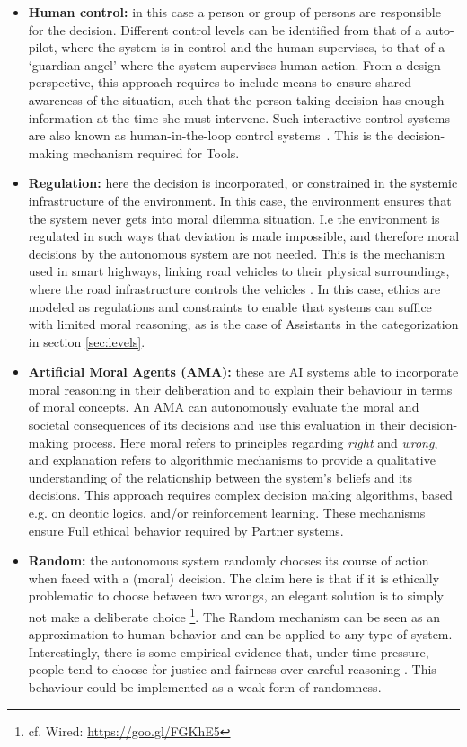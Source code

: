 \documentclass[twocolumn]{article}
\begin{document}
\begin{itemize}
\item \textbf{Human control:} in this case a person or group of persons are responsible for the decision. Different control levels can be identified from that of a auto-pilot, where the system is in control and the human supervises, to that of a `guardian angel' where the system supervises human action. %
From a design perspective, this approach requires to include means to ensure shared awareness of the situation, such that the person taking decision has enough information at the time she must intervene. Such interactive control systems are also known as human-in-the-loop control systems~\cite{Li2014}. This is the decision-making mechanism required for Tools.
\item \textbf{Regulation:} here the decision is incorporated, or constrained in the systemic infrastructure of the environment. In this case, the environment ensures that the system never gets into moral dilemma situation. 
I.e the environment is regulated in such ways that deviation is made impossible, and therefore moral decisions by the autonomous system are not needed. This is the mechanism used in smart highways, linking road vehicles to their physical surroundings, where the road infrastructure controls the vehicles \cite{misener2006path}. In this case, ethics are modeled as regulations and constraints to enable that systems can suffice with limited moral reasoning, as is the case of Assistants in the categorization in section \ref{sec:levels}.
\item \textbf{Artificial Moral Agents (AMA):} these are AI systems able to incorporate moral reasoning in their deliberation and to explain their behaviour in terms of moral concepts. An AMA \cite{wallach2008moral} can autonomously evaluate the moral and societal consequences of its decisions and use this evaluation in their decision-making process. Here moral refers to principles regarding \textit{right} and \textit{wrong}, %
and explanation refers to algorithmic mechanisms to provide a qualitative understanding of the relationship between the system's beliefs and its decisions. This approach requires complex decision making algorithms, based e.g. on deontic logics, and/or reinforcement learning. These mechanisms ensure Full ethical behavior required by Partner systems.
\item \textbf{Random:} the autonomous system randomly chooses its course of action when faced with a (moral) decision. The claim here is that if it is ethically problematic to choose between two wrongs, an elegant solution is to simply not make a deliberate choice \footnote{cf. Wired: \url{https://goo.gl/FGKhE5}}. The Random mechanism can be seen as an approximation to human behavior and can be applied to any type of system. Interestingly, there is some empirical evidence that, under time pressure, people tend to choose for justice and fairness over careful reasoning \cite{SJOP:SJOP367}. This behaviour could be implemented as a weak form of randomness. 
\end{itemize}
\end{document}
